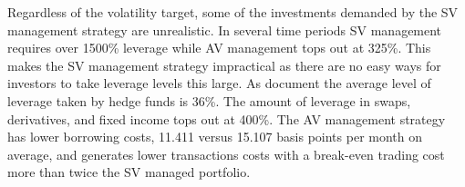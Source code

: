 Regardless of the volatility target, some of the investments demanded by the SV management strategy are unrealistic. In several time periods SV management requires over 1500\% leverage while AV management tops out at 325\%. This makes the SV management strategy impractical as there are no easy ways for investors to take leverage levels this large. As \citet{ang_hedge_2011} document the average level of leverage taken by hedge funds is 36\%. The amount of leverage in swaps, derivatives, and fixed income tops out at 400\%.  %
The AV management strategy has lower borrowing costs, 11.411 versus 15.107 basis points per month on average, and generates lower transactions costs with a break-even trading cost more than twice the SV managed portfolio. %

